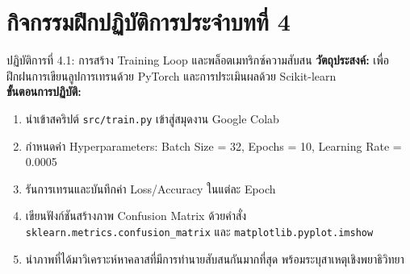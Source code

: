 \section*{กิจกรรมฝึกปฏิบัติการประจำบทที่ 4}
\begin{nocodebox}{ปฏิบัติการที่ 4.1: การสร้าง Training Loop และพล็อตเมทริกซ์ความสับสน}
\textbf{วัตถุประสงค์:} เพื่อฝึกฝนการเขียนลูปการเทรนด้วย PyTorch และการประเมินผลด้วย Scikit-learn\\
\textbf{ขั้นตอนการปฏิบัติ:}
\begin{enumerate}[leftmargin=1.4em, itemsep=2pt]
    \item นำเข้าสคริปต์ \texttt{src/train.py} เข้าสู่สมุดงาน Google Colab
    \item กำหนดค่า Hyperparameters: Batch Size = 32, Epochs = 10, Learning Rate = 0.0005
    \item รันการเทรนและบันทึกค่า Loss/Accuracy ในแต่ละ Epoch
    \item เขียนฟังก์ชันสร้างภาพ Confusion Matrix ด้วยคำสั่ง \texttt{sklearn.metrics.confusion\_matrix} และ \texttt{matplotlib.pyplot.imshow}
    \item นำภาพที่ได้มาวิเคราะห์หาคลาสที่มีการทำนายสับสนกันมากที่สุด พร้อมระบุสาเหตุเชิงพยาธิวิทยา
\end{enumerate}
\end{nocodebox}
